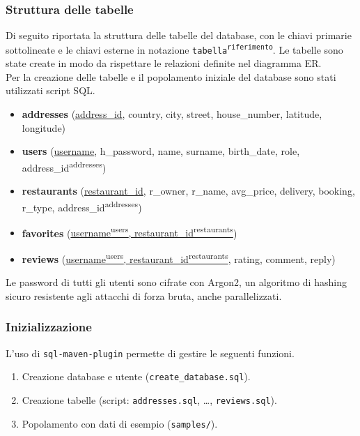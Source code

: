 \subsubsection{Struttura delle tabelle}
\begin{description}
Di seguito riportata la struttura delle tabelle del database,
con le chiavi primarie sottolineate e le chiavi esterne in notazione \texttt{tabella\textsuperscript{riferimento}}.
Le tabelle sono state create in modo da rispettare le relazioni definite nel diagramma ER.\\
Per la creazione delle tabelle e il popolamento iniziale del database sono stati utilizzati script SQL.
\begin{itemize}
    \item \textbf{addresses} (\underline{address\_id}, country, city, street, house\_number, latitude, longitude)
    \item \textbf{users} (\underline{username}, h\_password, name, surname, birth\_date, role, address\_id\textsuperscript{addresses})
    \item \textbf{restaurants} (\underline{restaurant\_id}, r\_owner, r\_name, avg\_price, delivery, booking, r\_type, address\_id\textsuperscript{addresses})
    \item \textbf{favorites} (\underline{username\textsuperscript{users}, restaurant\_id\textsuperscript{restaurants}})
    \item \textbf{reviews} (\underline{username\textsuperscript{users}, restaurant\_id\textsuperscript{restaurants}}, rating, comment, reply)
\end{itemize}
\end{description}
Le password di tutti gli utenti sono cifrate con Argon2, 
un algoritmo di hashing sicuro resistente agli attacchi di 
forza bruta, anche parallelizzati.

\subsubsection{Inizializzazione}
L'uso di \texttt{sql-maven-plugin} permette di gestire le seguenti funzioni.
\begin{enumerate}
  \item Creazione database e utente (\texttt{create\_database.sql}).
  \item Creazione tabelle (script: \texttt{addresses.sql}, \dots, \texttt{reviews.sql}).
  \item Popolamento con dati di esempio (\texttt{samples/}).
\end{enumerate}

